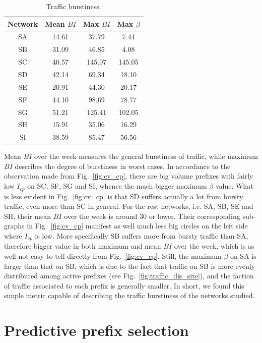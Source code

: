 \begin{table}[!htb]
\centering
\begin{tabular}{cccc}\toprule
\textbf{Network} & \textbf{Mean $BI$} & \textbf{Max $BI$} & \textbf{Max $\beta$}\\
\midrule
SA & 14.61 & 37.79  &  7.44\\
SB & 31.09 & 46.85  &  4.08\\
SC & 40.57 & 145.07 &  145.05\\
SD & 42.14 & 69.34  &  18.10\\
SE & 20.91 & 44.30  &  20.17\\
SF & 44.10 & 98.69  &  78.77\\
SG & 51.21 & 125.41 &  102.05\\
SH & 15.91 & 35.06  &  16.29\\
SI & 38.59 & 85.47  &  56.56\\
\bottomrule
\end{tabular}
\caption{Traffic burstiness.}
\label{tab:bi}
\end{table}

Mean $BI$ over the week measures the general burstiness of traffic, while maximum $BI$ describes the degree of burstiness in worst cases.
In accordance to the observation made from Fig.~\ref{fig:cv_cp}, there are big volume prefixes with fairly low $I_{cp}$ on SC, SF, SG and SI, whence the much bigger maximum $\beta$ value.
What is less evident in Fig.~\ref{fig:cv_cp} is that SD suffers actually a lot from bursty traffic, even more than SC in general.
For the rest networks, i.e. SA, SB, SE and SH, their mean $BI$ over the week is around 30 or lower. Their corresponding sub-graphs in Fig.~\ref{fig:cv_cp} manifest as well much less big circles on the left side where $I_{cp}$ is low.
More specifically SB suffers more from bursty traffic than SA, therefore bigger value in both maximum and mean $BI$ over the week, which is as well not easy to tell directly from Fig.~\ref{fig:cv_cp}.
Still, the maximum $\beta$ on SA is larger than that on SB, which is due to the fact that traffic on SB is more evenly distributed among active prefixes (see Fig.~\ref{fig:traffic_dis_site}), and the faction of traffic associated to each prefix is generally smaller.
In short, we found this simple metric capable of describing the traffic burstiness of the networks studied.


\section{Predictive prefix selection}
\label{sec:sele}

